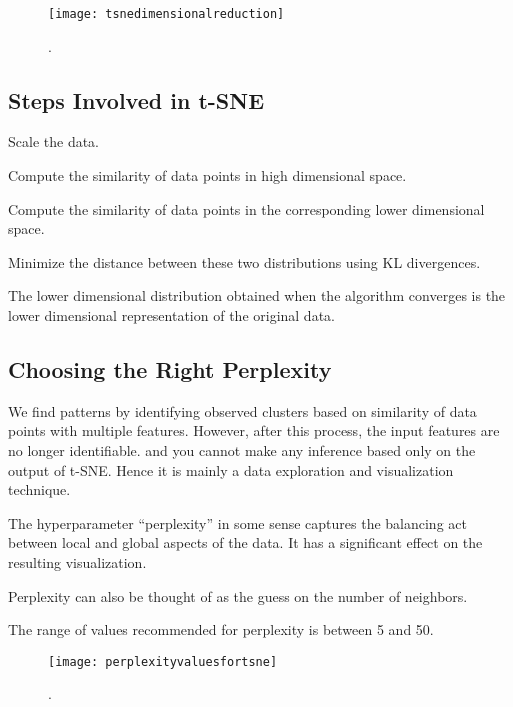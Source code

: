  	\begin{figure}[h]
		\centering
		\texttt{[image: tsnedimensionalreduction]}
		\caption{.}
		\label{fig:tsnedimensionalreduction}
	\end{figure}

	\subsection{Steps Involved in t-SNE}
	\begin{bulletedlist}
		\item Scale the data.
		\item Compute the similarity of data points in high dimensional space.
		\item Compute the similarity of data points in the corresponding lower dimensional space.
		\item Minimize the distance between these two distributions using KL divergences.
		\item The lower dimensional distribution obtained when the algorithm converges is the lower dimensional representation of the original data.
	\end{bulletedlist}

	\subsection{Choosing the Right Perplexity}
	\begin{bulletedlist}
		\item We find patterns by identifying observed clusters based on similarity of data points with multiple features.  However, after this process, the input features are no longer identifiable. and you cannot make any inference based only on the output of t-SNE.  Hence it is mainly a data exploration and visualization technique.
		\item The hyperparameter ``perplexity'' in some sense captures the balancing act between local and global aspects of the data.  It has a significant effect on the resulting visualization.
		\item Perplexity can also be thought of as the guess on the number of neighbors.
		\item The range of values recommended for perplexity is between 5 and 50.
	\end{bulletedlist}

 	\begin{figure}[h]
		\centering
		\texttt{[image: perplexityvaluesfortsne]}
		\caption{.}
		\label{fig:perplexityvaluesfortsne}
	\end{figure}

